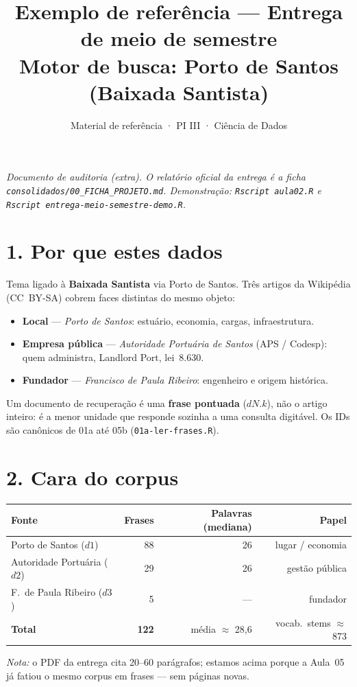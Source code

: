\documentclass[11pt,a4paper]{article}
\title{\vspace{-1.2cm}\textbf{Exemplo de referência} --- Entrega de meio de semestre\\
\large Motor de busca: Porto de Santos (Baixada Santista)}
\author{\small Material de referência · PI III · Ciência de Dados}
\date{}
\begin{document}
\maketitle
\vspace{-1.2cm}

\noindent\textit{Documento de auditoria (extra). O relatório oficial da entrega é a ficha
\texttt{consolidados/00\_FICHA\_PROJETO.md}. Demonstração: \texttt{Rscript aula02.R}
e \texttt{Rscript entrega-meio-semestre-demo.R}.}

\section*{1. Por que estes dados}
Tema ligado à \textbf{Baixada Santista} via Porto de Santos. Três artigos da Wikipédia
(CC~BY-SA) cobrem faces distintas do mesmo objeto:

\begin{itemize}
  \setlength\itemsep{0.1em}
  \item \textbf{Local} --- \emph{Porto de Santos}: estuário, economia, cargas, infraestrutura.
  \item \textbf{Empresa pública} --- \emph{Autoridade Portuária de Santos} (APS / Codesp):
        quem administra, Landlord Port, lei~8.630.
  \item \textbf{Fundador} --- \emph{Francisco de Paula Ribeiro}: engenheiro e origem histórica.
\end{itemize}

Um documento de recuperação é uma \textbf{frase pontuada} ($dN.k$), não o artigo inteiro:
é a menor unidade que responde sozinha a uma consulta digitável. Os IDs são canônicos de
01a até 05b (\texttt{01a-ler-frases.R}).

\section*{2. Cara do corpus}
\begin{center}
\begin{tabular}{@{}lrrr@{}}
\toprule
Fonte & Frases & Palavras (mediana) & Papel \\
\midrule
Porto de Santos ($d1$) & 88 & 26 & lugar / economia \\
Autoridade Portuária ($d2$) & 29 & 26 & gestão pública \\
F.\ de Paula Ribeiro ($d3$) & 5 & --- & fundador \\
\midrule
\textbf{Total} & \textbf{122} & média $\approx$ 28,6 & vocab.\ stems $\approx$ 873 \\
\bottomrule
\end{tabular}
\end{center}
\noindent\textit{Nota:} o PDF da entrega cita 20--60 parágrafos; estamos acima porque a Aula~05
já fatiou o mesmo corpus em frases --- sem páginas novas.
\end{document}

